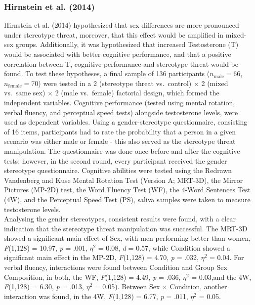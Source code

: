 \documentclass[
  stu,floatsintext]{apa7}
\begin{document}
\subsubsection{Hirnstein et al. (2014)}\label{hirnsteingenderstereotypingcognitivesex2014}

Hirnstein et al. (2014) hypothesized that sex differences are more pronounced under stereotype threat, moreover, that this effect would be amplified in mixed-sex groups.
Additionally, it was hypothesized that increased Testosterone (T) would be associated with better cognitive performance, and that a positive correlation between T, cognitive performance and stereotype threat would be found.
To test these hypotheses, a final sample of 136 participants (\(n_{\text{male}} = 66\), \(n_{\text{female}} = 70\)) were tested in a 2 (stereotype threat vs.~control) \(\times\) 2 (mixed vs.~same sex) \(\times\) 2 (male vs.~female) factorial design, which formed the independent variables.
Cognitive performance (tested using mental rotation, verbal fluency, and perceptual speed tests) alongside testosterone levels, were used as dependent variables.
Using a gender-stereotype questionnaire, consisting of 16 items, participants had to rate the probability that a person in a given scenario was either male or female - this also served as the stereotype threat manipulation.
The questionnaire was done once before and after the cognitive tests; however, in the second round, every participant received the gender stereotype questionnaire.
Cognitive abilities were tested using the Redrawn Vandenberg and Kuse Mental Rotation Test (Version A; MRT-3D), the Mirror Pictures (MP-2D) test, the Word Fluency Test (WF), the 4-Word Sentences Test (4W), and the Perceptual Speed Test (PS), saliva samples were taken to measure testosterone levels.\\
Analysing the gender stereotypes, consistent results were found, with a clear indication that the stereotype threat manipulation was successful.
The MRT-3D showed a significant main effect of Sex, with men performing better than women, \emph{F}(1,128) = 10.97, \emph{p} = .001, \(\eta^{2}\) = 0.08, \emph{d} = 0.57, while Condition showed a significant main effect in the MP-2D, \emph{F}(1,128) = 4.70, \emph{p} = .032, \(\eta^{2}\) = 0.04.
For verbal fluency, interactions were found between Condition and Group Sex Composition, in both, the WF, \emph{F}(1,128) = 4.49, \emph{p} = .036, \(\eta^{2}\) = 0.03,and the 4W, \emph{F}(1,128) = 6.30, \emph{p} = .013, \(\eta^{2}\) = 0.05).
Between Sex \(\times\) Condition, another interaction was found, in the 4W, \emph{F}(1,128) = 6.77, \emph{p} = .011, \(\eta^{2}\) = 0.05.
\end{document}
